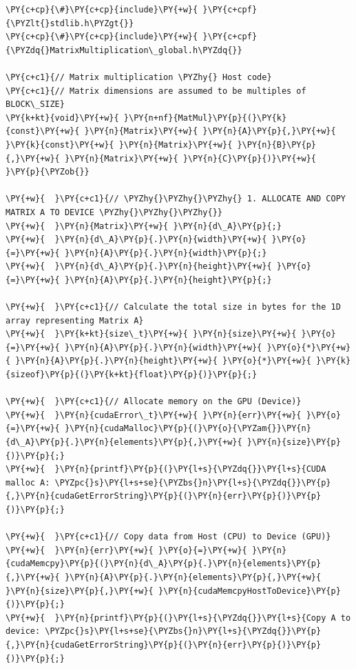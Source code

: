 \begin{Verbatim}[label=\makebox{\url{https://github.com/lucabaldini/cmepda/tree/master/slides/latex/snippets/MatrixMultiplication_global.cu}},commandchars=\\\{\}]
\PY{c+cp}{\#}\PY{c+cp}{include}\PY{+w}{ }\PY{c+cpf}{\PYZlt{}stdlib.h\PYZgt{}}
\PY{c+cp}{\#}\PY{c+cp}{include}\PY{+w}{ }\PY{c+cpf}{\PYZdq{}MatrixMultiplication\_global.h\PYZdq{}}

\PY{c+c1}{// Matrix multiplication \PYZhy{} Host code}
\PY{c+c1}{// Matrix dimensions are assumed to be multiples of BLOCK\_SIZE}
\PY{k+kt}{void}\PY{+w}{ }\PY{n+nf}{MatMul}\PY{p}{(}\PY{k}{const}\PY{+w}{ }\PY{n}{Matrix}\PY{+w}{ }\PY{n}{A}\PY{p}{,}\PY{+w}{ }\PY{k}{const}\PY{+w}{ }\PY{n}{Matrix}\PY{+w}{ }\PY{n}{B}\PY{p}{,}\PY{+w}{ }\PY{n}{Matrix}\PY{+w}{ }\PY{n}{C}\PY{p}{)}\PY{+w}{ }\PY{p}{\PYZob{}}

\PY{+w}{  }\PY{c+c1}{// \PYZhy{}\PYZhy{}\PYZhy{} 1. ALLOCATE AND COPY MATRIX A TO DEVICE \PYZhy{}\PYZhy{}\PYZhy{}}
\PY{+w}{  }\PY{n}{Matrix}\PY{+w}{ }\PY{n}{d\_A}\PY{p}{;}
\PY{+w}{  }\PY{n}{d\_A}\PY{p}{.}\PY{n}{width}\PY{+w}{ }\PY{o}{=}\PY{+w}{ }\PY{n}{A}\PY{p}{.}\PY{n}{width}\PY{p}{;}
\PY{+w}{  }\PY{n}{d\_A}\PY{p}{.}\PY{n}{height}\PY{+w}{ }\PY{o}{=}\PY{+w}{ }\PY{n}{A}\PY{p}{.}\PY{n}{height}\PY{p}{;}

\PY{+w}{  }\PY{c+c1}{// Calculate the total size in bytes for the 1D array representing Matrix A}
\PY{+w}{  }\PY{k+kt}{size\_t}\PY{+w}{ }\PY{n}{size}\PY{+w}{ }\PY{o}{=}\PY{+w}{ }\PY{n}{A}\PY{p}{.}\PY{n}{width}\PY{+w}{ }\PY{o}{*}\PY{+w}{ }\PY{n}{A}\PY{p}{.}\PY{n}{height}\PY{+w}{ }\PY{o}{*}\PY{+w}{ }\PY{k}{sizeof}\PY{p}{(}\PY{k+kt}{float}\PY{p}{)}\PY{p}{;}

\PY{+w}{  }\PY{c+c1}{// Allocate memory on the GPU (Device)}
\PY{+w}{  }\PY{n}{cudaError\_t}\PY{+w}{ }\PY{n}{err}\PY{+w}{ }\PY{o}{=}\PY{+w}{ }\PY{n}{cudaMalloc}\PY{p}{(}\PY{o}{\PYZam{}}\PY{n}{d\_A}\PY{p}{.}\PY{n}{elements}\PY{p}{,}\PY{+w}{ }\PY{n}{size}\PY{p}{)}\PY{p}{;}
\PY{+w}{  }\PY{n}{printf}\PY{p}{(}\PY{l+s}{\PYZdq{}}\PY{l+s}{CUDA malloc A: \PYZpc{}s}\PY{l+s+se}{\PYZbs{}n}\PY{l+s}{\PYZdq{}}\PY{p}{,}\PY{n}{cudaGetErrorString}\PY{p}{(}\PY{n}{err}\PY{p}{)}\PY{p}{)}\PY{p}{;}

\PY{+w}{  }\PY{c+c1}{// Copy data from Host (CPU) to Device (GPU)}
\PY{+w}{  }\PY{n}{err}\PY{+w}{ }\PY{o}{=}\PY{+w}{ }\PY{n}{cudaMemcpy}\PY{p}{(}\PY{n}{d\_A}\PY{p}{.}\PY{n}{elements}\PY{p}{,}\PY{+w}{ }\PY{n}{A}\PY{p}{.}\PY{n}{elements}\PY{p}{,}\PY{+w}{ }\PY{n}{size}\PY{p}{,}\PY{+w}{ }\PY{n}{cudaMemcpyHostToDevice}\PY{p}{)}\PY{p}{;}
\PY{+w}{  }\PY{n}{printf}\PY{p}{(}\PY{l+s}{\PYZdq{}}\PY{l+s}{Copy A to device: \PYZpc{}s}\PY{l+s+se}{\PYZbs{}n}\PY{l+s}{\PYZdq{}}\PY{p}{,}\PY{n}{cudaGetErrorString}\PY{p}{(}\PY{n}{err}\PY{p}{)}\PY{p}{)}\PY{p}{;}


\end{Verbatim}
